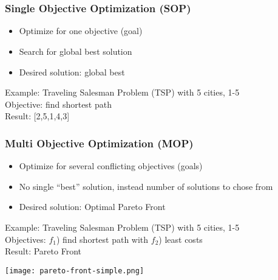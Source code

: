 \section{}
\begin{frame}
  \frametitle{Single Objective Optimization (SOP)}
  \begin{itemize}
    \item Optimize for one objective (goal)
    \item Search for global best solution
    \item Desired solution: global best
  \end{itemize}
  \vspace{1em}
  Example: Traveling Salesman Problem (TSP) with 5 cities, 1-5\\
  Objective: find shortest path\\
  Result: [2,5,1,4,3]
\end{frame}

\begin{frame}
  \frametitle{Multi Objective Optimization (MOP)}
  \begin{itemize}
    \item Optimize for several conflicting objectives (goals)
    \item No single ``best'' solution, instead number of solutions to chose from
    \item Desired solution: Optimal Pareto Front
  \end{itemize}
  \vspace{1em}
  Example: Traveling Salesman Problem (TSP) with 5 cities, 1-5\\
  Objectives: $f_1$) find shortest path with $f_2$) least costs\\
  Result: Pareto Front
  \begin{center}
    \texttt{[image: pareto-front-simple.png]}
  \end{center}
\end{frame}


